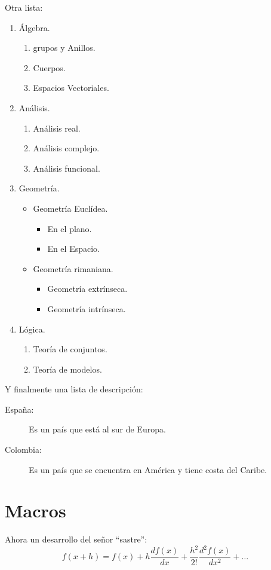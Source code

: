 \documentclass[letter,12pt]{article}
\def\beq{\begin{equation}}
\def\eeq{\end{equation}}
\newcommand{\derivadaN}[3]{\frac{d^{#3}#1}{d#2^{#3}}}
\def\derivada#1#2{\frac{d#1}{d#2}}
\begin{document}
Otra lista:
\begin{enumerate}
\item Álgebra.
	\begin{enumerate}
	\item grupos y Anillos.
	\item Cuerpos.
	\item Espacios Vectoriales.
	\end{enumerate}
\item Análisis.
	\begin{enumerate}
	\item Análisis real.
	\item Análisis complejo.
	\item Análisis funcional.
	\end{enumerate}
\item Geometría.
	\begin{itemize}
	\item Geometría Euclídea.
		\begin{itemize}
		\renewcommand{\labelitemii}{$\partial$}
		\item En el plano.
		\item En el Espacio.
		\end{itemize}
	\item  Geometría rimaniana.
		\begin{itemize}
		\item Geometría extrínseca.
		\item Geometría intrínseca.
		\end{itemize}
	\end{itemize}
\item Lógica.
	\begin{enumerate}
	\item Teoría de conjuntos.
	\item Teoría de modelos.
	\end{enumerate}
\end{enumerate}
Y finalmente una lista de descripción:
\begin{description}
\item[España:] Es un país que está 
al sur de Europa.
\item[Colombia:] Es un país que se encuentra en América y
tiene costa del Caribe.
\end{description}

\section{Macros}
Ahora un desarrollo del señor   ``sastre'':
\beq
f(x+h)=f(x) + h\derivada{f(x)}{x} + \frac{h^2}{2!}\derivadaN{f(x)}{x}{2} + \dots
\eeq
\end{document}
